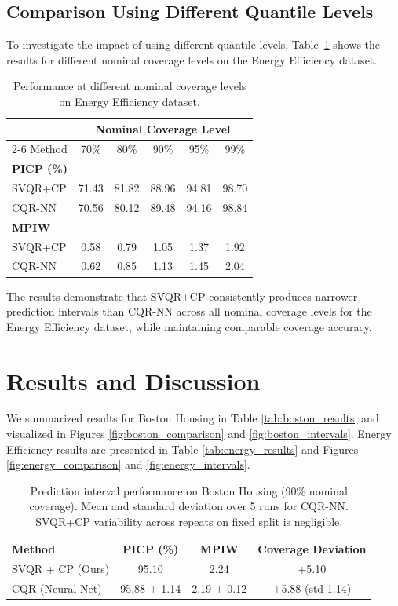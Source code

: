 \documentclass{article}
\begin{document}
\subsection{Comparison Using Different Quantile Levels}

To investigate the impact of using different quantile levels, Table~\ref{tab:quantiles} shows the results for different nominal coverage levels on the Energy Efficiency dataset.

\begin{table}[ht]
  \centering
  \caption{Performance at different nominal coverage levels on Energy Efficiency dataset.}
  \label{tab:quantiles}
  \begin{tabular}{lccccc}
    \toprule
    & \multicolumn{5}{c}{Nominal Coverage Level} \\
    \cmidrule(lr){2-6}
    Method & 70\% & 80\% & 90\% & 95\% & 99\% \\
    \midrule
    \multicolumn{6}{l}{\textbf{PICP (\%)}} \\
    SVQR+CP & 71.43 & 81.82 & 88.96 & 94.81 & 98.70 \\
    CQR-NN & 70.56 & 80.12 & 89.48 & 94.16 & 98.84 \\
    \midrule
    \multicolumn{6}{l}{\textbf{MPIW}} \\
    SVQR+CP & 0.58 & 0.79 & 1.05 & 1.37 & 1.92 \\
    CQR-NN & 0.62 & 0.85 & 1.13 & 1.45 & 2.04 \\
    \bottomrule
  \end{tabular}
\end{table}

The results demonstrate that SVQR+CP consistently produces narrower prediction intervals than CQR-NN across all nominal coverage levels for the Energy Efficiency dataset, while maintaining comparable coverage accuracy.

\section{Results and Discussion}
We summarized results for Boston Housing in Table \ref{tab:boston_results} and visualized in Figures \ref{fig:boston_comparison} and \ref{fig:boston_intervals}. Energy Efficiency results are presented in Table \ref{tab:energy_results} and Figures \ref{fig:energy_comparison} and \ref{fig:energy_intervals}.

\begin{table}[h!]
\caption{Prediction interval performance on Boston Housing (90\% nominal coverage). Mean and standard deviation over 5 runs for CQR-NN. SVQR+CP variability across repeats on fixed split is negligible.}
\label{tab:boston_results_summary}
\centering
\begin{tabular}{lccc}
\toprule
Method            & PICP (\%)       & MPIW            & Coverage Deviation \\
\midrule
SVQR + CP (Ours)  & 95.10            & 2.24            & +5.10               \\
CQR (Neural Net)  & 95.88 $\pm$ 1.14  & 2.19 $\pm$ 0.12  & +5.88 (std 1.14)     \\
\bottomrule
\end{tabular}
\end{table}
\end{document}
